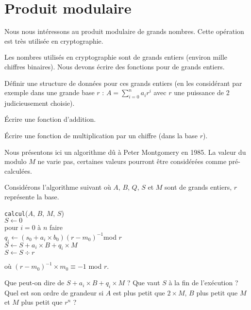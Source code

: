 \renewcommand{\SourceFile}{7-arithmetique-et-calculs-numeriques/src/7-4.ml}

\section{Produit modulaire}

Nous nous intéressons au produit modulaire de grands nombres. Cette opération est très utilisée en cryptographie.
\medskip

Les nombres utilisés en cryptographie sont de grands entiers (environ mille chiffres binaires). Nous devons écrire des fonctions pour de grands entiers.

\Q
Définir une structure de données pour ces grands entiers (en les considérant par exemple dans une grande base $r$ : $A=\sum_{i=0}^n a_ir^i$ avec $r$ une puissance de 2 judicieusement choisie).
\medskip

Écrire une fonction d'addition.
\medskip

Écrire une fonction de multiplication par un \og chiffre \fg{} (dans la base $r$).
\bigskip

Nous présentons ici un algorithme dû à Peter Montgomery en 1985. La valeur du modulo $M$ ne varie pas, certaines valeurs pourront être considérées comme pré-calculées.
\medskip

Considérons l'algorithme suivant où $A$, $B$, $Q$, $S$ et $M$ sont de grands entiers, $r$ représente la base.
\medskip

\texttt{calcul}($A$, $B$, $M$, $S$)\\
\hspace*{2em} $S \leftarrow 0$\\
\hspace*{2em} pour $i=0$ à $n$ faire\\
\hspace*{4em}   $q_i \leftarrow (s_0 + a_i \times b_0)(r-m_0)^{-1}$\quad mod $r$\\
\hspace*{4em}   $S \leftarrow S + a_i \times B + q_i \times M$\\
\hspace*{4em}   $S \leftarrow S \div r$
\bigskip

où $(r-m_0)^{-1} \times m_0 \equiv -1$ mod $r$.

\Q
Que peut-on dire de $S + a_i \times B + q_i \times M$ ? Que vaut $S$ à la fin de l'exécution ? Quel est son ordre de grandeur si $A$ est plus petit que $2 \times M$, $B$ plus petit que $M$ et $M$ plus petit que $r^n$ ?
\medskip


